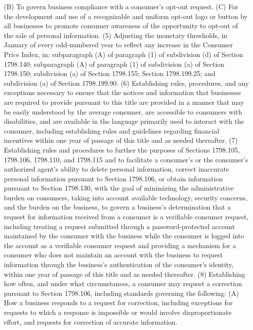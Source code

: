 (B) To govern business compliance with a consumer’s opt-out request.
(C) For the development and use of a recognizable and uniform opt-out logo or button by all businesses to promote consumer awareness of the opportunity to opt-out of the sale of personal information.
(5) Adjusting the monetary thresholds, in January of every odd-numbered year to reflect any increase in the Consumer Price Index, in: subparagraph (A) of paragraph (1) of subdivision (d) of Section 1798.140; subparagraph (A) of paragraph (1) of subdivision (a) of Section 1798.150; subdivision (a) of Section 1798.155; Section 1798.199.25; and subdivision (a) of Section 1798.199.90.
(6) Establishing rules, procedures, and any exceptions necessary to ensure that the notices and information that businesses are required to provide pursuant to this title are provided in a manner that may be easily understood by the average consumer, are accessible to consumers with disabilities, and are available in the language primarily used to interact with the consumer, including establishing rules and guidelines regarding financial incentives within one year of passage of this title and as needed thereafter.
(7) Establishing rules and procedures to further the purposes of Sections 1798.105, 1798.106, 1798.110, and 1798.115 and to facilitate a consumer’s or the consumer’s authorized agent’s ability to delete personal information, correct inaccurate personal information pursuant to Section 1798.106, or obtain information pursuant to Section 1798.130, with the goal of minimizing the administrative burden on consumers, taking into account available technology, security concerns, and the burden on the business, to govern a business’s determination that a request for information received from a consumer is a verifiable consumer request, including treating a request submitted through a password-protected account maintained by the consumer with the business while the consumer is logged into the account as a verifiable consumer request and providing a mechanism for a consumer who does not maintain an account with the business to request information through the business’s authentication of the consumer’s identity, within one year of passage of this title and as needed thereafter.
(8) Establishing how often, and under what circumstances, a consumer may request a correction pursuant to Section 1798.106, including standards governing the following:
(A) How a business responds to a request for correction, including exceptions for requests to which a response is impossible or would involve disproportionate effort, and requests for correction of accurate information.
